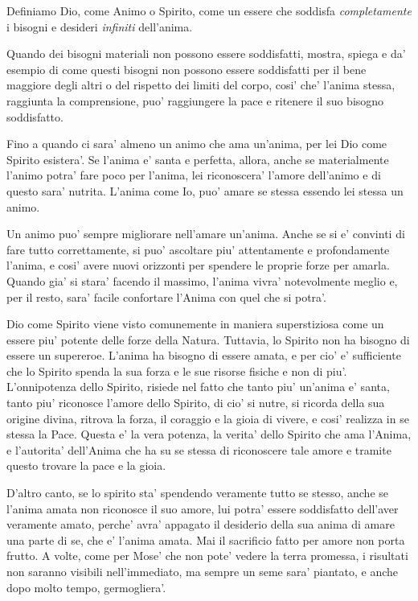    Definiamo Dio, come Animo o Spirito, come un essere che soddisfa \emph{completamente} i bisogni e desideri \emph{infiniti} dell'anima. 

   Quando dei bisogni materiali non possono essere soddisfatti, mostra, spiega e da' esempio di come questi bisogni non possono essere soddisfatti per il bene maggiore degli altri o del rispetto dei limiti del corpo, cosi' che' l'anima stessa, raggiunta la comprensione, puo' raggiungere la pace e ritenere il suo bisogno soddisfatto.

   Fino a quando ci sara' almeno un animo che ama un'anima, per lei Dio come Spirito esistera'. Se l'anima e' santa e perfetta, allora, anche se materialmente l'animo potra' fare poco per l'anima, lei riconoscera' l'amore dell'animo e di questo sara' nutrita. L'anima come Io, puo' amare se stessa essendo lei stessa un animo.

   Un animo puo' sempre migliorare nell'amare un'anima. Anche se si e' convinti di fare tutto correttamente, si puo' ascoltare piu' attentamente e profondamente l'anima, e cosi' avere nuovi orizzonti per spendere le proprie forze per amarla. 
   Quando gia' si stara' facendo il massimo, l'anima vivra' notevolmente meglio e, per il resto, sara' facile confortare l'Anima con quel che si potra'.

    Dio come Spirito viene visto comunemente in maniera superstiziosa come un essere piu' potente delle forze della Natura. Tuttavia, lo Spirito non ha bisogno di essere un supereroe. L'anima ha bisogno di essere amata, e per cio' e' sufficiente che lo Spirito spenda la sua forza e le sue risorse fisiche e non di piu'. L'onnipotenza dello Spirito, risiede nel fatto che tanto piu' un'anima e' santa, tanto piu' riconosce l'amore dello Spirito, di cio' si nutre, si ricorda della sua origine divina, ritrova la forza, il coraggio e la gioia di vivere, e cosi' realizza in se stessa la Pace.  Questa e' la vera potenza, la verita' dello Spirito che ama l'Anima, e l'autorita' dell'Anima che ha su se stessa di riconoscere tale amore e tramite questo trovare la pace e la gioia.

    D'altro canto, se lo spirito sta' spendendo veramente tutto se stesso, anche se l'anima amata non riconosce il suo amore, lui potra' essere soddisfatto dell'aver veramente amato, perche' avra' appagato il desiderio della sua anima di amare una parte di se, che e' l'anima amata. Mai il sacrificio fatto per amore non porta frutto. A volte, come per Mose' che non pote' vedere la terra promessa, i risultati non saranno visibili nell'immediato, ma sempre un seme sara' piantato, e anche dopo molto tempo, germogliera'.

